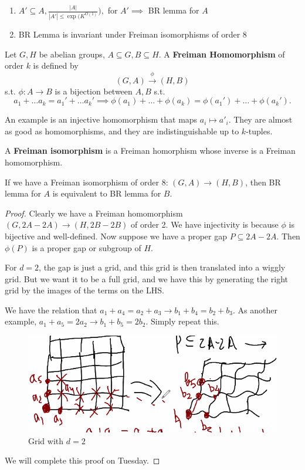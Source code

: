 \documentclass[a4paper]{article}
\begin{document}
\begin{enumerate}
	\item $A' \subseteq A, \frac{|A|}{|A'| \le \exp(K^{O(1)} }) ,$  for $A' \implies $ BR lemma for $A $
	\item BR Lemma is invariant under Freiman isomorphisms of order 8
\end{enumerate}

\begin{definition}
	Let $G,H $ be abelian groups, $A\subseteq G, B\subseteq H $.
	A \textbf{Freiman Homomorphism} of order $k $ is defined by
	\[
		(G,A) \xrightarrow{\phi} (H,B)
	\]
	s.t. $\phi:A\to B $ is a bijection between $A,B $ s.t.
	\[
		a_{1}+\ldots a_k = a_{1}'+\ldots a_k' \implies \phi(a_{1})+\ldots +\phi (a_k) = \phi (a_{1}') + \ldots +\phi (a_k').
	\]
\end{definition}

An example is an injective homomorphism that maps $a_{i} \mapsto a'_i $.
They are almost as good as homomorphisms, and they are indistinguishable up to $k $-tuples.

\begin{definition}
	A \textbf{Freiman isomorphism} is a Freiman homorphism whose inverse is a Freiman homomorphism.
\end{definition}

\begin{prop}
	If we have a Freiman isomorphism of order 8: $(G,A) \to (H,B) $, then BR lemma for $A $ is equivalent to BR lemma for $B $.
\end{prop}
\begin{proof}
	Clearly we have a Freiman homomorphism $(G,2A-2A) \to (H,2B-2B) $ of order 2.
	We have injectivity is because $\phi $ is bijective and well-defined.
	Now suppose we have a proper gap $P\subseteq 2A-2A $.
	Then $\phi(P) $ is a proper gap or subgroup of $H $.

	For $d=2 $, the gap is just a grid, and this grid is then translated into a wiggly grid.
	But we want it to be a full grid, and we have this by generating the right grid by the images of the terms on the LHS.

	We have the relation that $a_{1}+a_{4}=a_{2}+a_{3} \rightarrow b_{1}+b_{4}=b_{2}+b_{3}	$.
	As another example, $a_{1}+a_{5}=2a_{2} \rightarrow b_{1}+b_{5}=2b_{2} $.
	Simply repeat this.
	\begin{figure}[ht]
		\centering
		\includegraphics[width=.25\textwidth]{grid}
		\caption{Grid with $d=2 $ \label{fig:grid}}
	\end{figure}

	We will complete this proof on Tuesday.
\end{proof}
\end{document}
